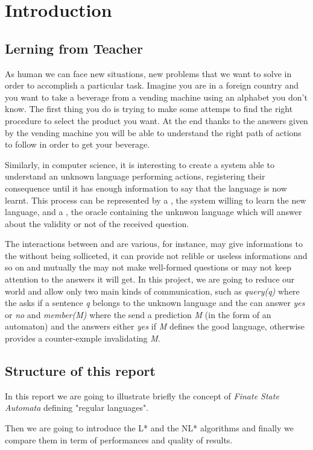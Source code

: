 \section{Introduction}

\subsection{Lerning from Teacher}

As human we can face new situations, new problems that we want to solve in order to accomplish a particular task.
Imagine you are in a foreign country and you want to take a beverage from a vending machine using an alphabet you don't know. The first thing you do is trying to make some attemps to find the right procedure to select the product you want. At the end thanks to the answers given by the vending machine you will be able to understand the right path of actions to follow in order to get your beverage.

Similarly, in computer science, it is interesting to create a system able to understand an unknown language performing actions, registering their consequence until it has enough information to say that the language is now learnt. This process can be represented by a \lerner{}, the system willing to learn the new language, and a \teacher{}, the oracle containing the unknwon language which will answer about the validity or not of the received question.

The interactions between \lerner{} and \teacher{} are various, for instance, \teacher{} may give informations to the \lerner{} without being solliceted, it can provide not relible or useless informations and so on and mutually the \lerner{} may not make well-formed questions or may not keep attention to the answers it will get.
In this project, we are going to reduce our world and allow only two main kinds of communication, such as
\textit{query(q)} where the \lerner{} asks if a sentence \textit{q} belongs to the unknown language and the \teacher{} can answer \textit{yes} or \textit{no} and
\textit{member(M)} where the \lerner{} send a prediction \textit{M} (in the form of an automaton) and the \teacher{} answers either \textit{yes} if \textit{M} defines the good language, otherwise provides a counter-exmple invalidating \textit{M}.
\subsection{Structure of this report}
In this report we are going to illustrate briefly the concept of \textit{Finate State Automata} defining "regular languages".

Then we are going to introduce the L* \cite{angluinL} and the NL* \cite{angluinNL} algorithms and finally we compare them in term of performances and quality of results.